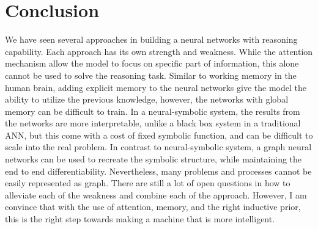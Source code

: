 \documentclass[journal]{IEEEtran}
\begin{document}
\section{Conclusion}

We have seen several approaches in building a neural networks with reasoning capability. 
Each approach has its own strength and weakness.
While the attention mechanism allow the model to focus on specific part of information, this alone cannot be used to solve the reasoning task.
Similar to working memory in the human brain, adding explicit memory to the neural networks give the model the ability to utilize the previous knowledge,
however, the networks with global memory can be difficult to train.
In a neural-symbolic system, the results from the networks are more interpretable, unlike a black box system in a traditional ANN,
but this come with a cost of fixed symbolic function, and can be difficult to scale into the real problem.
In contrast to neural-symbolic system, a graph neural networks can be used to recreate the symbolic structure, 
while maintaining the end to end differentiability. Nevertheless, many problems and processes cannot be easily represented as graph.
There are still a lot of open questions in how to alleviate each of the weakness and combine each of the approach. 
However, I am convince that with the use of attention, memory, and the right inductive prior, 
this is the right step towards making a machine that is more intelligent.



\end{document}
